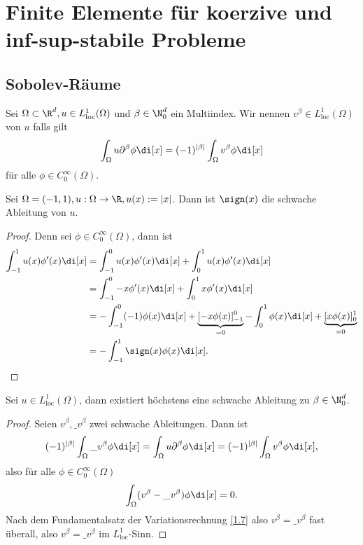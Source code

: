 \chapter{Finite Elemente für koerzive und inf-sup-stabile Probleme} \label{chap:3}


\section{Sobolev-Räume} \label{sec:3.1}


\begin{df} \label{3.1}
	Sei $\Omega \subset \R^d, u \in L_{\text{loc}}^1(\Omega)$ und $\beta \in \N_0^d$ ein Multiindex.
	Wir nennen $v^\beta \in L_{\text{loc}}^1(\Omega)$  von $u$ falls gilt
	\[
		\int_\Omega u \partial^\beta \phi \di[x]
		= (-1)^{|\beta|} \int_\Omega v^\beta \phi \di[x]
	\]
	für alle $\phi \in C_0^\infty(\Omega)$.
\end{df}

\begin{ex*}
	Sei $\Omega = (-1, 1), u: \Omega \to \R, u(x) := |x|$.
	Dann ist $\sign(x)$ die schwache Ableitung von $u$.
	\begin{proof}
		Denn sei $\phi \in C_0^\infty(\Omega)$, dann ist
		\begin{align*}
			\int_{-1}^1 u(x) \phi'(x) \di[x]
			&= \int_{-1}^0 u(x) \phi'(x) \di[x]
			+ \int_0^1 u(x) \phi'(x) \di[x] \\
			&= \int_{-1}^0 -x \phi'(x) \di[x]
			+ \int_0^1 x \phi'(x) \di[x] \\
			&= - \int_{-1}^0 (-1) \phi(x) \di[x] + \underbrace{[-x \phi(x)]_{-1}^0}_{=0}
			- \int_0^1 \phi(x) \di[x] + \underbrace{[x \phi(x)]_0^1}_{=0} \\
			&= - \int_{-1}^1 \sign(x) \phi(x) \di[x].
		\end{align*}
	\end{proof}
\end{ex*}

\begin{st}[Eindeutigkeit] \label{3.2}
	Sei $u \in L^1_{\text{loc}}(\Omega)$, dann existiert höchstens eine schwache Ableitung zu $\beta \in \N_0^d$.
	\begin{proof}
		Seien $v^\beta, \_v^\beta$ zwei schwache Ableitungen.
		Dann ist
		\[
			(-1)^{|\beta|} \int_\Omega \_v^\beta \phi \di[x]
			= \int_\Omega u \partial^\beta \phi \di[x]
			= (-1)^{|\beta|} \int_\Omega v^\beta \phi \di[x],
		\]
		also für alle $\phi \in C_0^\infty(\Omega)$
		\[
			\int_\Omega (v^\beta - \_v^\beta) \phi \di[x] = 0.
		\]
		Nach dem Fundamentalsatz der Variationsrechnung \ref{1.7} also $v^\beta = \_v^\beta$ fast überall, also $v^\beta = \_v^\beta$ im $L^1_{\text{loc}}$-Sinn.
	\end{proof}
\end{st}

